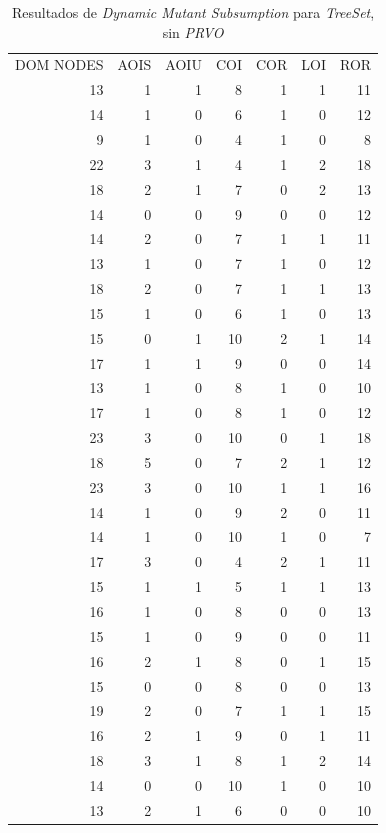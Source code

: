 \begin{table}[]
	\caption[\emph{Dynamic Mutant Subsumption} \emph{TreeSet}, sin \emph{PRVO}]{Resultados de \emph{Dynamic Mutant Subsumption} para \emph{TreeSet}, sin \emph{PRVO}}
	\label{tables.results.subsumption.treeset.noprvo}
	\centering
	\scriptsize
	\def\arraystretch{0.95}
	\setlength\tabcolsep{0.5mm}
	\begin{tabular}{rrrrrrr}
		DOM NODES & AOIS & AOIU & COI & COR & LOI & ROR \\
		13 & 1 & 1 & 8 & 1 & 1 & 11 \\
		14 & 1 & 0 & 6 & 1 & 0 & 12 \\
		9 & 1 & 0 & 4 & 1 & 0 & 8 \\
		22 & 3 & 1 & 4 & 1 & 2 & 18 \\
		18 & 2 & 1 & 7 & 0 & 2 & 13 \\
		14 & 0 & 0 & 9 & 0 & 0 & 12 \\
		14 & 2 & 0 & 7 & 1 & 1 & 11 \\
		13 & 1 & 0 & 7 & 1 & 0 & 12 \\
		18 & 2 & 0 & 7 & 1 & 1 & 13 \\
		15 & 1 & 0 & 6 & 1 & 0 & 13 \\
		15 & 0 & 1 & 10 & 2 & 1 & 14 \\
		17 & 1 & 1 & 9 & 0 & 0 & 14 \\
		13 & 1 & 0 & 8 & 1 & 0 & 10 \\
		17 & 1 & 0 & 8 & 1 & 0 & 12 \\
		23 & 3 & 0 & 10 & 0 & 1 & 18 \\
		18 & 5 & 0 & 7 & 2 & 1 & 12 \\
		23 & 3 & 0 & 10 & 1 & 1 & 16 \\
		14 & 1 & 0 & 9 & 2 & 0 & 11 \\
		14 & 1 & 0 & 10 & 1 & 0 & 7 \\
		17 & 3 & 0 & 4 & 2 & 1 & 11 \\
		15 & 1 & 1 & 5 & 1 & 1 & 13 \\
		16 & 1 & 0 & 8 & 0 & 0 & 13 \\
		15 & 1 & 0 & 9 & 0 & 0 & 11 \\
		16 & 2 & 1 & 8 & 0 & 1 & 15 \\
		15 & 0 & 0 & 8 & 0 & 0 & 13 \\
		19 & 2 & 0 & 7 & 1 & 1 & 15 \\
		16 & 2 & 1 & 9 & 0 & 1 & 11 \\
		18 & 3 & 1 & 8 & 1 & 2 & 14 \\
		14 & 0 & 0 & 10 & 1 & 0 & 10 \\
		13 & 2 & 1 & 6 & 0 & 0 & 10
	\end{tabular}
\end{table}

